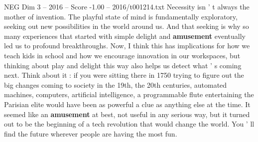 \begin{textsample}{NEG Dim 3 – 2016 – Score -1.00 – 2016/t001214.txt}
Necessity isn ' t always the mother of invention.
The playful state of mind is fundamentally exploratory, seeking out new possibilities in the world around us.
And that seeking is why so many experiences that started with simple delight and \textbf{amusement} eventually led us to profound breakthroughs.
Now, I think this has implications for how we teach kids in school and how we encourage innovation in our workspaces, but thinking about play and delight this way also helps us detect what ' s coming next.
Think about it : if you were sitting there in 1750 trying to figure out the big changes coming to society in the 19th, the 20th centuries, automated machines, computers, artificial intelligence, a programmable flute entertaining the Parisian elite would have been as powerful a clue as anything else at the time.
It seemed like an \textbf{amusement} at best, not useful in any serious way, but it turned out to be the beginning of a tech revolution that would change the world.
You ' ll find the future wherever people are having the most fun.

\end{textsample}
